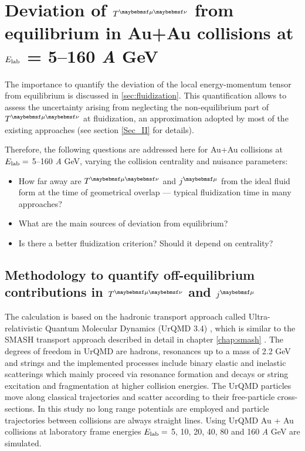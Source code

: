 \chapter{Deviation of $\Tmn$ from equilibrium in Au+Au collisions at $E_\mathrm{lab}$ = 5--160 \emph{A} GeV}
\label{chap:local_equilibration}

The importance to quantify the deviation of the local energy-momentum tensor from
equilibrium is discussed in \ref{sec:fluidization}. This quantification allows to assess
the uncertainty arising from neglecting the non-equilibrium part of $\Tmn$ at
fluidization, an approximation adopted by most of the existing approaches (see section
\ref{Sec_II} for details).

Therefore, the following questions are addressed here for Au+Au collisions
at $E_\mathrm{lab} = $ 5--160 \emph{A} GeV, varying the collision centrality and nuisance
parameters:

\begin{itemize}
    \item How far away are $\Tmn$ and $\jmu$ from the ideal fluid form at the time of
          geometrical overlap --- typical fluidization time in many approaches?
    \item What are the main sources of deviation from equilibrium? 
    \item Is there a better fluidization criterion? Should it depend on centrality?
\end{itemize}

\section{Methodology to quantify off-equilibrium contributions in $\Tmn$ and $\jmu$} \label{sec:Methodology}

The calculation is based on the hadronic transport approach called
Ultra-relativistic Quantum Molecular Dynamics (UrQMD 3.4)
\cite{Bass:1998ca,Bleicher:1999xi}, which is similar to the SMASH transport
approach described in detail in chapter \ref{chap:smash} . The degrees of
freedom in UrQMD are hadrons, resonances up to a mass of 2.2 GeV and strings
and the implemented processes include binary elastic and inelastic scatterings
which mainly proceed via resonance formation and decays or string excitation
and fragmentation at higher collision energies. The UrQMD particles move along
classical trajectories and scatter according to their free-particle
cross-sections. In this study  no long range potentials are employed and
particle trajectories between collisions are always straight lines. Using UrQMD
Au + Au collisions at laboratory frame energies $E_\mathrm{lab} =$ 5, 10, 20, 40, 80 and
160 \emph{A} GeV are simulated.


